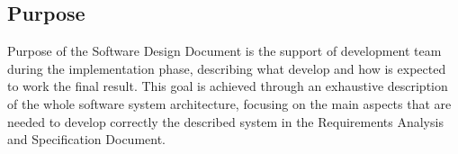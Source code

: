 \subsection{Purpose}

Purpose of the Software Design Document is the support of development team during the implementation phase, describing what develop and how is expected to work the final result. This goal is achieved through an exhaustive description of the whole software system architecture, focusing on the main aspects that are needed to develop correctly the described system in the Requirements Analysis and Specification Document.
